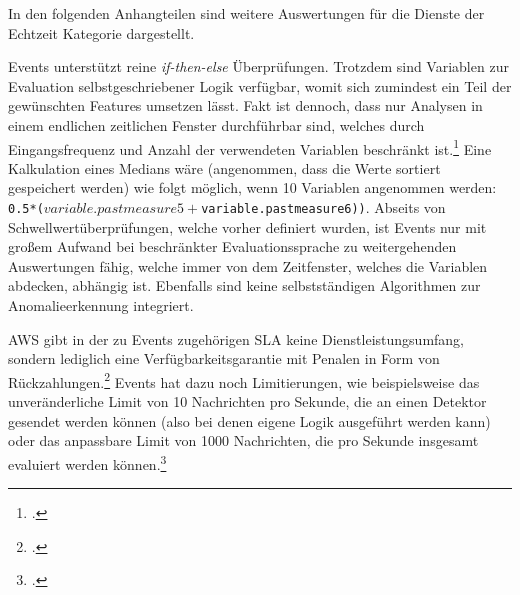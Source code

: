 \label{anhang:vergleich-echtzeit}
In den folgenden Anhangteilen sind weitere Auswertungen für die Dienste der Echtzeit Kategorie dargestellt.

\AWSIOT{} Events unterstützt reine \textit{if-then-else} Überprüfungen. Trotzdem sind Variablen zur Evaluation selbstgeschriebener Logik verfügbar, womit sich zumindest ein Teil der gewünschten Features umsetzen lässt. Fakt ist dennoch, dass nur Analysen in einem endlichen zeitlichen Fenster durchführbar sind, welches durch Eingangsfrequenz und Anzahl der verwendeten Variablen beschränkt ist.\footcite[Vgl.][]{AmazonWebServicesInc..o.J.am} Eine Kalkulation eines Medians wäre (angenommen, dass die Werte sortiert gespeichert werden) wie folgt möglich, wenn 10 Variablen angenommen werden: \texttt{0.5*($variable.pastmeasure5 + $variable.pastmeasure6))}.
Abseits von Schwellwertüberprüfungen, welche vorher definiert wurden, ist \AWSIOT{} Events nur mit großem Aufwand bei beschränkter Evaluationssprache zu weitergehenden Auswertungen fähig, welche immer von dem Zeitfenster, welches die Variablen abdecken, abhängig ist. Ebenfalls sind keine selbstständigen Algorithmen zur Anomalieerkennung integriert.

\ac{AWS} gibt in der zu \AWSIOT{} Events zugehörigen \ac{SLA} keine Dienstleistungsumfang, sondern lediglich eine Verfügbarkeitsgarantie mit Penalen in Form von Rückzahlungen.\footcite[Vgl.][]{AmazonWebServicesInc..o.J.an} \AWSIOT{} Events hat dazu noch Limitierungen, wie beispielsweise das unveränderliche Limit von 10 Nachrichten pro Sekunde, die an einen Detektor gesendet werden können (also bei denen eigene Logik ausgeführt werden kann) oder das anpassbare Limit von 1000 Nachrichten, die pro Sekunde insgesamt evaluiert werden können.\footcite[Vgl.][]{AmazonWebServicesInc..o.J.ap}

